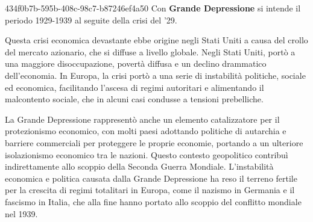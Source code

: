 \documentclass[preview]{standalone}
\begin{document}
\begin{snippet}{434f0b7b-595b-408c-98c7-b87246ef4a50}
    Con \textbf{Grande Depressione} si intende il periodo 1929-1939 al seguite della crisi del '29.

    Questa crisi economica devastante ebbe origine negli Stati Uniti a causa del crollo del mercato azionario,
    che si diffuse a livello globale.
    Negli Stati Uniti, portò a una maggiore disoccupazione, povertà diffusa e un
    declino drammatico dell'economia.
    In Europa, la crisi portò a una serie di instabilità politiche, sociale ed economica,
    facilitando l'ascesa di regimi autoritari e alimentando il malcontento sociale,
    che in alcuni casi condusse a tensioni prebelliche.
    
    La Grande Depressione rappresentò anche un elemento catalizzatore per il protezionismo economico,
    con molti paesi adottando politiche di autarchia e barriere commerciali per proteggere le proprie economie,
    portando a un ulteriore isolazionismo economico tra le nazioni.
    Questo contesto geopolitico contribuì indirettamente allo scoppio della Seconda Guerra Mondiale.
    L'instabilità economica e politica causata dalla Grande Depressione ha reso il terreno
    fertile per la crescita di regimi totalitari in Europa, come il nazismo in Germania e il fascismo in Italia,
    che alla fine hanno portato allo scoppio del conflitto mondiale nel 1939.
\end{snippet}
\end{document}
